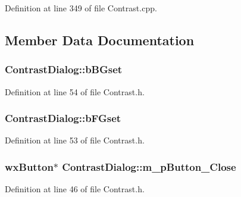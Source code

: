 Definition at line 349 of file Contrast.\+cpp.



\subsection{Member Data Documentation}
\subsubsection[{\texorpdfstring{b\+B\+Gset}{bBGset}}]{ Contrast\+Dialog\+::b\+B\+Gset}\hypertarget{class_contrast_dialog_aef59715818b2e9154abf4dc29dfef32e}{}\label{class_contrast_dialog_aef59715818b2e9154abf4dc29dfef32e}


Definition at line 54 of file Contrast.\+h.

\subsubsection[{\texorpdfstring{b\+F\+Gset}{bFGset}}]{ Contrast\+Dialog\+::b\+F\+Gset}\hypertarget{class_contrast_dialog_a0e91746f09808acf97500681f8875611}{}\label{class_contrast_dialog_a0e91746f09808acf97500681f8875611}


Definition at line 53 of file Contrast.\+h.

\subsubsection[{\texorpdfstring{m\+\_\+p\+Button\+\_\+\+Close}{m_pButton_Close}}]{\setlength{\rightskip}{0pt plus 5cm}wx\+Button$\ast$ Contrast\+Dialog\+::m\+\_\+p\+Button\+\_\+\+Close}\hypertarget{class_contrast_dialog_a0474b1f29e9c970708fd6ff2423199f8}{}\label{class_contrast_dialog_a0474b1f29e9c970708fd6ff2423199f8}


Definition at line 46 of file Contrast.\+h.

